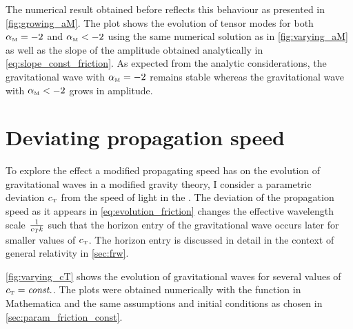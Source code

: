 \documentclass[parskip=half]{scrreprt}
\begin{document}
The numerical result obtained before reflects this behaviour as presented in \autoref{fig:growing_aM}. The plot shows the evolution of tensor modes for both \({\alpha_{\textnormal{\tiny{M}}}} = -2\) and \({\alpha_{\textnormal{\tiny{M}}}} < -2\) using the same numerical solution as in \autoref{fig:varying_aM} as well as the slope of the amplitude obtained analytically in \eqref{eq:slope_const_friction}. As expected from the analytic considerations, the gravitational wave with \({\alpha_{\textnormal{\tiny{M}}}} = -2\) remains stable whereas the gravitational wave with \({\alpha_{\textnormal{\tiny{M}}}} < -2\) grows in amplitude.



\section{Deviating propagation speed}

To explore the effect a modified propagating speed has on the evolution of gravitational waves in a modified gravity theory, I consider a parametric deviation \({c_{\textnormal{\tiny{T}}}}\) from the speed of light in the . The deviation of the propagation speed as it appears in \eqref{eq:evolution_friction} changes the effective wavelength scale \(\frac{1}{{c_{\textnormal{\tiny{T}}}} k}\) such that the horizon entry of the gravitational wave occurs later for smaller values of \({c_{\textnormal{\tiny{T}}}}\). The horizon entry is discussed in detail in the context of general relativity in \autoref{sec:frw}.

\autoref{fig:varying_cT} shows the evolution of gravitational waves for several values of \({c_{\textnormal{\tiny{T}}}}=\textnormal{\textit{const.}}\). The plots were obtained numerically with the  function in Mathematica and the same assumptions and initial conditions as chosen in \autoref{sec:param_friction_const}.

\end{document}
